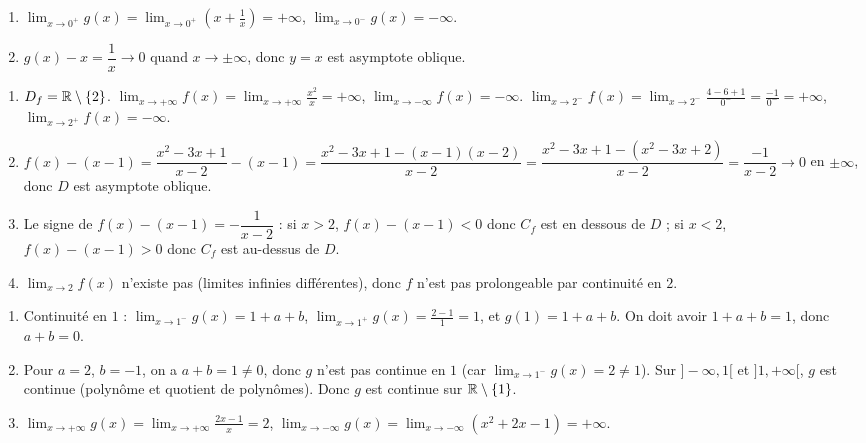 \begin{enumerate}[label=\alph*)]
\item $\displaystyle\lim_{x\to 0^+} g(x)=\lim_{x\to 0^+} \left(x+\frac{1}{x}\right)=+\infty$, $\displaystyle\lim_{x\to 0^-} g(x)=-\infty$.
\item $g(x)-x=\dfrac{1}{x}\to 0$ quand $x\to \pm\infty$, donc $y=x$ est asymptote oblique.
\end{enumerate}

\begin{enumerate}[label=\arabic*)]
\item $D_f=\mathbb{R}\setminus\{2\}$. $\displaystyle\lim_{x\to +\infty} f(x)=\lim_{x\to +\infty} \frac{x^2}{x}=+\infty$, $\displaystyle\lim_{x\to -\infty} f(x)=-\infty$. $\displaystyle\lim_{x\to 2^-} f(x)=\lim_{x\to 2^-} \frac{4-6+1}{0^-}=\frac{-1}{0^-}=+\infty$, $\displaystyle\lim_{x\to 2^+} f(x)=-\infty$.
\item $f(x)-(x-1)=\dfrac{x^2-3x+1}{x-2}-(x-1)=\dfrac{x^2-3x+1-(x-1)(x-2)}{x-2}=\dfrac{x^2-3x+1-(x^2-3x+2)}{x-2}=\dfrac{-1}{x-2}\to 0$ en $\pm\infty$, donc $D$ est asymptote oblique.
\item Le signe de $f(x)-(x-1)=-\dfrac{1}{x-2}$ : si $x>2$, $f(x)-(x-1)<0$ donc $C_f$ est en dessous de $D$ ; si $x<2$, $f(x)-(x-1)>0$ donc $C_f$ est au-dessus de $D$.
\item $\displaystyle\lim_{x\to 2} f(x)$ n'existe pas (limites infinies différentes), donc $f$ n'est pas prolongeable par continuité en $2$.
\end{enumerate}

\begin{enumerate}[label=\arabic*)]
\item Continuité en $1$ : $\displaystyle\lim_{x\to 1^-} g(x)=1+a+b$, $\displaystyle\lim_{x\to 1^+} g(x)=\frac{2-1}{1}=1$, et $g(1)=1+a+b$. On doit avoir $1+a+b=1$, donc $a+b=0$.
\item Pour $a=2$, $b=-1$, on a $a+b=1\neq 0$, donc $g$ n'est pas continue en $1$ (car $\displaystyle\lim_{x\to 1^-} g(x)=2\neq 1$). Sur $]-\infty,1[$ et $]1,+\infty[$, $g$ est continue (polynôme et quotient de polynômes). Donc $g$ est continue sur $\mathbb{R}\setminus\{1\}$.
\item $\displaystyle\lim_{x\to +\infty} g(x)=\lim_{x\to +\infty} \frac{2x-1}{x}=2$, $\displaystyle\lim_{x\to -\infty} g(x)=\lim_{x\to -\infty} (x^2+2x-1)=+\infty$.
\end{enumerate}

